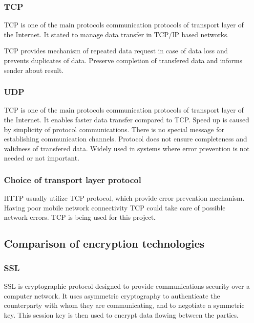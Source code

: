 \documentclass[thesis=M,english]{FITthesis}[2012/10/20]
\begin{document}
\subsubsection{TCP}

TCP is one of the main protocols communication protocols of transport layer of the Internet. It stated to manage data transfer in TCP/IP based networks.

TCP provides mechanism of repeated data request in case of data loss and prevents duplicates of data. Preserve completion of transfered data and informs sender about result.

\subsubsection{UDP}

TCP is one of the main protocols communication protocols of transport layer of the Internet. It enables faster data transfer compared to TCP. Speed up is caused by simplicity of protocol communications. There is no special message for establishing communication channels. Protocol does not ensure completeness and validness of transfered data. Widely used in systems where error prevention is not needed or not important.

\subsubsection{Choice of transport layer protocol}

HTTP usually utilize TCP protocol, which provide error prevention mechanism. Having poor mobile network connectivity TCP could take care of possible network errors. TCP is being used for this project.

\subsection{Comparison of encryption technologies}

\subsubsection{SSL}

SSL is cryptographic protocol designed to provide communications security over a computer network.  It uses asymmetric cryptography to authenticate the counterparty with whom they are communicating, and to negotiate a symmetric key. This session key is then used to encrypt data flowing between the parties.
\end{document}
